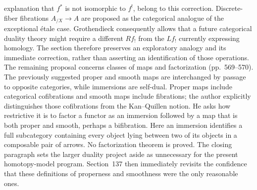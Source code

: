 \documentclass[10pt,oneside]{book}
\begin{document}
explanation that $f^*$ is not isomorphic to $f^!$, belong to this correction. Discrete-fiber fibrations $A_{/X}\to A$ are proposed as the categorical analogue of the exceptional étale case. Grothendieck consequently allows that a future categorical duality theory might require a different $Rf_!$ from the $Lf_!$ currently expressing homology. The section therefore preserves an exploratory analogy and its immediate correction, rather than asserting an identification of those operations. The remaining proposal concerns classes of maps and factorization (pp.~569--570). The previously suggested proper and smooth maps are interchanged by passage to opposite categories, while immersions are self-dual. Proper maps include categorical cofibrations and smooth maps include fibrations; the author explicitly distinguishes those cofibrations from the Kan--Quillen notion. He asks how restrictive it is to factor a functor as an immersion followed by a map that is both proper and smooth, perhaps a bifibration. Here an immersion identifies a full subcategory containing every object lying between two of its objects in a composable pair of arrows. No factorization theorem is proved. The closing paragraph sets the larger duality project aside as unnecessary for the present homotopy-model program. Section~137 then immediately revisits the confidence that these definitions of properness and smoothness were the only reasonable ones.
\end{document}
